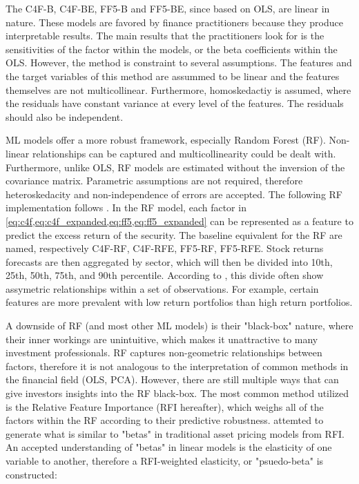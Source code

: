 The C4F-B, C4F-BE, FF5-B and FF5-BE, since based on OLS, are linear in nature. These models are favored by finance practitioners because they produce interpretable results. The main results that the practitioners look for is the sensitivities of the factor within the models, or the beta coefficients within the OLS. However, the method is constraint to several assumptions. The features and the target variables of this method are assummed to be linear and the features themselves are not multicollinear. Furthermore, homoskedactiy is assumed, where the residuals have constant variance at every level of the features. The residuals should also be independent.

ML models offer a more robust framework, especially Random Forest (RF). Non-linear relationships can be captured and multicollinearity could be dealt with. Furthermore, unlike OLS, RF models are estimated without the inversion of the covariance matrix. Parametric assumptions are not required, therefore heteroskedacity and non-independence of errors are accepted. The following RF implementation follows . In the RF model, each factor in \cref{eq:c4f,eq:c4f_expanded,eq:ff5,eq:ff5_expanded} can be represented as a feature to predict the excess return of the security. The baseline equivalent for the RF are named, respectively C4F-RF, C4F-RFE, FF5-RF, FF5-RFE. Stock returns forecasts are then aggregated by sector, which will then be divided into 10th, 25th, 50th, 75th, and 90th percentile. According to , this divide often show assymetric relationships within a set of observations. For example, certain features are more prevalent with low return portfolios than high return portfolios.

A downside of RF (and most other ML models) is their "black-box" nature, where their inner workings are unintuitive, which makes it unattractive to many investment professionals. RF captures non-geometric relationships between factors, therefore it is not analogous to the interpretation of common methods in the financial field (OLS, PCA). However, there are still multiple ways that can give investors insights into the RF black-box. The most common method utilized is the Relative Feature Importance (RFI hereafter), which weighs all of the factors within the RF according to their predictive robustness.  attemted to generate what is similar to "betas" in traditional asset pricing models from RFI. An accepted understanding of "betas" in linear models is the elasticity of one variable to another, therefore a RFI-weighted elasticity, or "psuedo-beta" is constructed:


